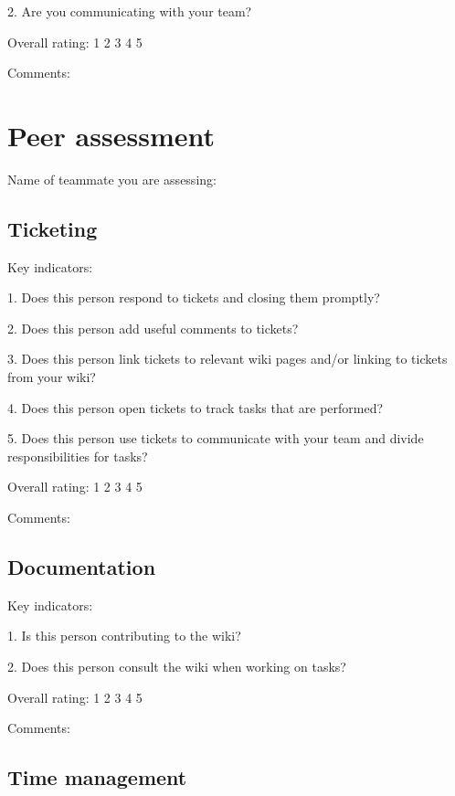 \documentclass{article}   	%
\begin{document}
2.  Are you communicating with your team?


Overall rating: \hskip 1cm 1 \hskip 1cm 2 \hskip 1cm 3 \hskip 1cm 4 \hskip 1cm 5 

Comments:

\vskip 4cm
    
\newpage

\section*{Peer assessment}

Name of teammate you are assessing: 
\vskip 1cm

\subsection*{Ticketing}

Key indicators: 

1.  Does this person respond to tickets and closing them promptly?

2.  Does this person add useful comments to tickets?

3.  Does this person link tickets to relevant wiki pages and/or linking to tickets from your wiki?

4.  Does this person open tickets to track tasks that are performed?

5.  Does this person use tickets to communicate with your team and divide responsibilities for tasks?

Overall rating: \hskip 1cm 1 \hskip 1cm 2 \hskip 1cm 3 \hskip 1cm 4 \hskip 1cm 5 

Comments:

\vskip 5cm



\subsection*{Documentation}

Key indicators: 

1.  Is this person contributing to the wiki?

2.  Does this person consult the wiki when working on tasks?

Overall rating: \hskip 1cm 1 \hskip 1cm 2 \hskip 1cm 3 \hskip 1cm 4 \hskip 1cm 5 

Comments:

\newpage

\subsection*{Time management}
\end{document}
